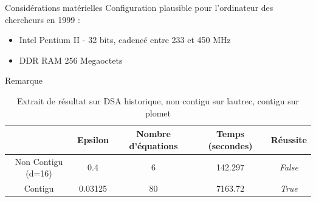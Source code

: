 \documentclass{backend/backend}
\begin{document}
\begin{frame}{Considérations matérielles}
Configuration plausible pour l'ordinateur des chercheurs en 1999 :
\begin{itemize}
    \item Intel Pentium II - 32 bits, cadencé entre 233 et 450 MHz %
    \item DDR RAM 256 Megaoctets
\end{itemize}

\end{frame}


\begin{frame}{Remarque}
\begin{center}
    \begin{table}[H]
        \centering
        \caption{Extrait de résultat sur DSA historique, non contigu sur lautrec, contigu sur plomet}
        \label{tab:echec_non_contigu}
        \begin{tabular}{|c|c|c|c|c|}
            \toprule
            & Epsilon & Nombre d'équations & Temps (secondes) & Réussite \\
            \midrule
             Non Contigu (d=16) \label{tab:obsrv1} &  0.4     & 6  & 142.297 & \textit{False} \\
             Contigu \label{tab:obsrv2}    &  0.03125 & 80 & 7163.72 & \textit{True} \\
            \bottomrule
        \end{tabular}
    \end{table}
\end{center}
\begin{center}
    \smallbreak
    \smallbreak
\end{center}

\end{frame}
\end{document}
